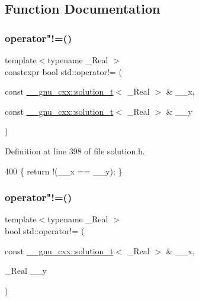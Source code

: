 \subsection{Function Documentation}
\mbox{\label{namespacestd_a0f89c0cd89caea7c7413c22c4c7e21f9}} 
\subsubsection{\texorpdfstring{operator"!=()}{operator!=()}\hspace{0.1cm}{\footnotesize\ttfamily [1/5]}}
{\footnotesize\ttfamily template$<$typename \+\_\+\+Real $>$ \\
constexpr bool std\+::operator!= (\begin{DoxyParamCaption}\item[{const \hyperlink{namespace____gnu__cxx_ae20ea642de50eb361074c62676b0159c}{\+\_\+\+\_\+gnu\+\_\+cxx\+::solution\+\_\+t}$<$ \+\_\+\+Real $>$ \&}]{\+\_\+\+\_\+x,  }\item[{const \hyperlink{namespace____gnu__cxx_ae20ea642de50eb361074c62676b0159c}{\+\_\+\+\_\+gnu\+\_\+cxx\+::solution\+\_\+t}$<$ \+\_\+\+Real $>$ \&}]{\+\_\+\+\_\+y }\end{DoxyParamCaption})}



Definition at line 398 of file solution.\+h.


\begin{DoxyCode}
400     \{ \textcolor{keywordflow}{return} !(\_\_x == \_\_y); \}
\end{DoxyCode}
\mbox{\label{namespacestd_a88548a06c4013d8e23c70a25a48a8929}} 
\subsubsection{\texorpdfstring{operator"!=()}{operator!=()}\hspace{0.1cm}{\footnotesize\ttfamily [2/5]}}
{\footnotesize\ttfamily template$<$typename \+\_\+\+Real $>$ \\
bool std\+::operator!= (\begin{DoxyParamCaption}\item[{const \hyperlink{namespace____gnu__cxx_ae20ea642de50eb361074c62676b0159c}{\+\_\+\+\_\+gnu\+\_\+cxx\+::solution\+\_\+t}$<$ \+\_\+\+Real $>$ \&}]{\+\_\+\+\_\+x,  }\item[{\+\_\+\+Real}]{\+\_\+\+\_\+y }\end{DoxyParamCaption})}



